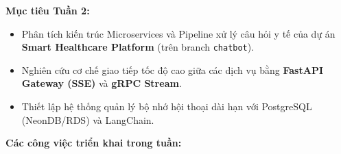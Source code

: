 \vspace{0.5em}\noindent\textbf{Mục tiêu Tuần 2:}

\begin{itemize}
\tightlist
\item
  Phân tích kiến trúc Microservices và Pipeline xử lý câu hỏi y tế của
  dự án \textbf{Smart Healthcare Platform} (trên branch
  \texttt{chatbot}).
\item
  Nghiên cứu cơ chế giao tiếp tốc độ cao giữa các dịch vụ bằng
  \textbf{FastAPI Gateway (SSE)} và \textbf{gRPC Stream}.
\item
  Thiết lập hệ thống quản lý bộ nhớ hội thoại dài hạn với PostgreSQL
  (NeonDB/RDS) và LangChain.
\end{itemize}

\vspace{0.5em}\noindent\textbf{Các công việc triển khai trong tuần:}

